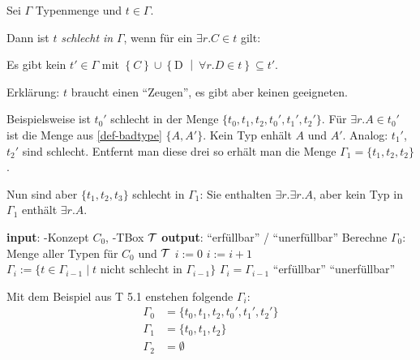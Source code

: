 \begin{definition}\label{def-badtype}

Sei $\Gamma$ Typenmenge und $t \in \Gamma$.

Dann ist $t$ \emph{schlecht in} $\Gamma$, wenn für ein $\exists r.C \in t$ gilt:

\begin{center}Es gibt kein $t' \in \Gamma$ mit
$\left\{ C \right\} \cup \left\{ \text{D\ } \middle| \ \forall r.D \in t \right\} \subseteq t'$.\end{center}
\end{definition}

Erklärung: $t$ braucht einen \enquote{Zeugen}, es gibt aber keinen
geeigneten.

\begin{tafel}[continues=t:synTyp]

    Beispielsweise ist $t_0'$ schlecht in der Menge $\{t_0,t_1,t_2,t_0',t_1',t_2'\}$. Für $\exists r.A \in t_0'$ ist die Menge aus \autoref{def-badtype} $\{A,A'\}$. Kein Typ enhält $A$ und $A'$. Analog: $t_1'$, $t_2'$ sind schlecht. Entfernt man diese drei so erhält man die Menge $\Gamma_1 = \{t_1,t_2,t_2\}$. 

Nun sind aber $\{t_1,t_2,t_3\}$ schlecht in $\Gamma_1$: Sie enthalten $\exists r. \exists r.A$, aber kein Typ in $\Gamma_1$ enthält $\exists r.A$.
\end{tafel}

\begin{algorithmic}
    \State \textbf{input}: \ALC-Konzept $C_0$, \ALC-TBox $\mathcal{T}$
    \State \textbf{output}: \enquote{erfüllbar} / \enquote{unerfüllbar}
    \State Berechne $\Gamma_0$: Menge aller Typen für $C_0$ und $\mathcal{T}$
    \State $i := 0$
    \Repeat
        \State $i := i + 1$
        \State $\Gamma_i := \{ t \in \Gamma_{i - 1} \mid t \text{ nicht schlecht in } \Gamma_{i - 1}\}$
    \Until $\Gamma_i = \Gamma_{i - 1}$
        \Return \enquote{erfüllbar}
    \Else{}
        \Return \enquote{unerfüllbar}
    \EndIf
    \EndProcedure{}
\end{algorithmic}

\begin{tafel}[continues=t:synTyp]
    Mit dem Beispiel aus T 5.1 enstehen folgende $\Gamma_i$:
    \begin{align*}
        \Gamma_0 &= \{t_0, t_1, t_2, t_0', t_1', t_2'\}\\
        \Gamma_1 &= \{t_0, t_1, t_2\}\\
        \Gamma_2 &= \emptyset
    \end{align*}
\end{tafel}

